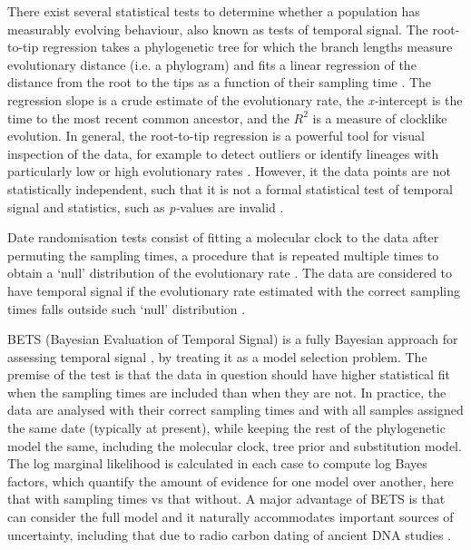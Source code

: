 \documentclass[10pt,letterpaper]{article}
\begin{document}
There exist several statistical tests to determine whether a population has measurably evolving behaviour, also known as tests of temporal signal. The root-to-tip regression takes a phylogenetic tree for which the branch lengths measure evolutionary distance (i.e. a phylogram) and fits a linear regression of the distance from the root to the tips as a function of their sampling time \cite{korber2000timing}. The regression slope is a crude estimate of the evolutionary rate, the \textit{x-}intercept is the time to the most recent common ancestor, and the $R^2$ is a measure of clocklike evolution. In general, the root-to-tip regression is a powerful tool for visual inspection of the data, for example to detect outliers or identify lineages with particularly low or high evolutionary rates \cite{rambaut2016exploring,featherstone2023clockor2,volz2017scalable}. However, it the data points are not statistically independent, such that it is not a formal statistical test of temporal signal and statistics, such as \textit{p-}values are invalid \cite{rieux2016inferences}.

Date randomisation tests consist of fitting a molecular clock to the data after permuting the sampling times, a procedure that is repeated multiple times to obtain a `null' distribution of the evolutionary rate \cite{ramsden2009hantavirus}. The data are considered to have temporal signal if the evolutionary rate estimated with the correct sampling times falls outside such `null' distribution \cite{ramsden2009hantavirus,duchene2015performance}.

BETS (Bayesian Evaluation of Temporal Signal) is a fully Bayesian approach for assessing temporal signal \cite{duchene2020bayesian}, by treating it as a model selection problem. The premise of the test is that the data in question should have higher statistical fit when the sampling times are included than when they are not. In practice, the data are analysed with their correct sampling times and with all samples assigned the same date (typically at present), while keeping the rest of the phylogenetic model the same, including the molecular clock, tree prior and substitution model. The log marginal likelihood is calculated in each case to compute log Bayes factors, which quantify the amount of evidence for one model over another, here that with sampling times vs that without. A major advantage of BETS is that can consider the full model and it naturally accommodates important sources of uncertainty, including that due to radio carbon dating of ancient DNA studies \cite{molak2015empirical}. 
\end{document}
